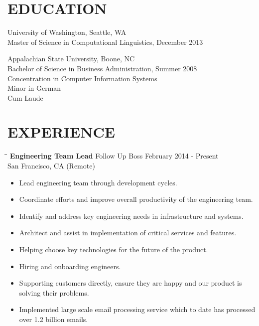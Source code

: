 \documentclass{res}
\begin{document}
\address{\large\bf  Anthony Gentile}
\address{Matthews, NC \\  asgentile@gmail.com}

\begin{resume}

\section{EDUCATION}
    University of Washington, Seattle, WA  \\
    Master of Science in Computational Linguistics, December 2013

    Appalachian State University, Boone, NC  \\
    Bachelor of Science in Business Administration, Summer 2008   \\
    Concentration in Computer Information Systems       \\
    Minor in German  \\
    Cum Laude

\section{EXPERIENCE}
   \vspace{-0.1in}
   \begin{tabbing}
   \hspace{2.3in}\= \hspace{2.6in}\= \kill %
    {\bf Engineering Team Lead} \>Follow Up Boss     \> February 2014 - Present\\
                             \>San Francisco, CA (Remote)
   \end{tabbing}\vspace{-5pt}      %
   \begin{itemize}
    \item Lead engineering team through development cycles.
    \item Coordinate efforts and improve overall productivity of the engineering team.
    \item Identify and address key engineering needs in infrastructure and systems.
    \item Architect and assist in implementation of critical services and features.
    \item Helping choose key technologies for the future of the product.
    \item Hiring and onboarding engineers.
    \item Supporting customers directly, ensure they are happy and our product is solving their problems.
    \item Implemented large scale email processing service which to date has processed over 1.2 billion emails.
   \end{itemize}


\end{resume}
\end{document}
